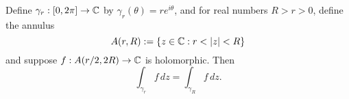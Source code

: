 \documentclass{homework}
\begin{document}
                                                                                                                                                             \begin{problem}
                                                                                                                                                               Define $\gamma_r : [0,2\pi] \to \mathbb{C}$ by
                                                                                                                                                                 $\gamma_r(\theta) = r e^{i \theta}$, and for real numbers
                                                                                                                                                                   $R > r > 0$, define the annulus
                                                                                                                                                                     \[
                                                                                                                                                                         A(r,R) := \{ z \in \mathbb{C} : r < |z| < R \}
                                                                                                                                                                           \]
                                                                                                                                                                             and suppose $f : A(r/2,2R) \to \mathbb{C}$ is holomorphic.  Then
                                                                                                                                                                               \[
                                                                                                                                                                                   \int_{\gamma_r} f \, dz = \int_{\gamma_R} f \, dz.
                                                                                                                                                                                     \]
                                                                                                                                                                                     \end{problem}
\end{document}
